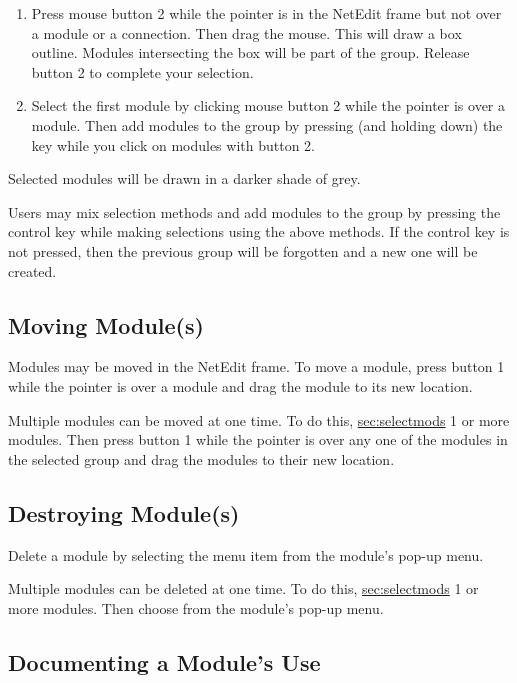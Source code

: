 \begin{enumerate}
\item Press mouse button 2 while the pointer is in the NetEdit frame but not over
a module or a connection.  Then drag the mouse.  This will draw a box
outline.  Modules intersecting the box will be part of the group.  Release
button 2 to complete your selection.
\item Select the first module by clicking mouse button 2 while the pointer is
over a module.  Then add modules to the group by pressing (and holding
down) the  key while you click on modules with button 2.
\end{enumerate}

Selected modules will be drawn in a darker shade of grey.

Users may mix selection methods and  add modules to the group by
pressing the control key while making selections using the above methods.
If  the control key is not pressed, then the previous group will be
forgotten and a new one will be created.

\subsection{Moving Module(s)}
\label{sec:movemod}

Modules may be moved in the NetEdit frame.  To move a module,
press button 1 while the pointer is over a module and drag the module to
its new location.

Multiple modules can be moved at one time.  To do this,
\hyperref{select}{select (see Section~}{)}{sec:selectmods} 1 or more
modules. Then press button 1 while the pointer is over any one of the
modules in the selected group and drag the modules to their new location.


\subsection{Destroying Module(s)}
\label{sec:destroymod}

Delete a module by selecting the  menu item from the
module's pop-up menu.

Multiple modules can be deleted at one time.  To do this,
\hyperref{select}{select (see Section~}{)}{sec:selectmods} 1 or more
modules. Then choose   from the module's pop-up menu.
 


\subsection{Documenting a Module's Use}
\label{sec:docmodule}

